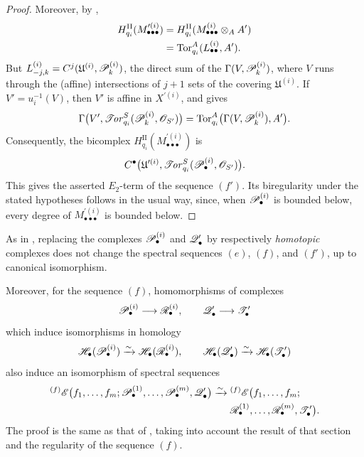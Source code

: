 \begin{proof}
Moreover, by ,
\[
\begin{split}
  H_{q_i}^{\mathrm{II}}
  (M_{\bullet\bullet\bullet}^{\prime(i)})
  &=
  H_{q_i}^{\mathrm{II}}
  (M_{\bullet\bullet\bullet}^{(i)}\otimes_AA')
  \\
  &=
  \operatorname{Tor}_{q_i}^A(L_{\bullet\bullet}^{(i)},A').
\end{split}
\]
But $L_{-j,k}^{(i)}=C^j(\mathfrak U^{(i)},\mathscr{P}_k^{(i)})$, the direct sum of the
$\Gamma(V,\mathscr{P}_k^{(i)})$, where $V$ runs through the (affine)
intersections of $j+1$ sets of the covering $\mathfrak U^{(i)}$.  If
$V'=u_i^{-1}(V)$, then $V'$ is affine in $X^{\prime(i)}$, and
 gives
\[
  \Gamma
  \bigl(
    V',
    \mathscr{T}\!\mathit{or}_{q_i}^S
    (\mathscr{P}_k^{(i)},\mathscr{O}_{S'})
  \bigr)
  =
  \operatorname{Tor}_{q_i}^A
  \bigl(
    \Gamma(V,\mathscr{P}_k^{(i)}),A'
  \bigr).
\]
Consequently, the bicomplex
$H_{q_i}^{\mathrm{II}}
(M_{\bullet\bullet\bullet}^{\prime(i)})$
is
\[
  C^\bullet
  \bigl(
    \mathfrak U^{\prime(i)},
    \mathscr{T}\!\mathit{or}_{q_i}^S
    (\mathscr{P}_\bullet^{(i)},\mathscr{O}_{S'})
  \bigr).
\]
This gives the asserted $E_2$-term of the sequence $(f')$.  Its
biregularity under the stated hypotheses follows in the usual way,
since, when $\mathscr{P}_\bullet^{(i)}$ is bounded below, every degree of
$M_{\bullet\bullet\bullet}^{\prime(i)}$ is bounded below.
\end{proof}

\begin{remark}[6.9.5]
\label{III.6.9.5}
As in , replacing the complexes
$\mathscr{P}_\bullet^{(i)}$ and $\mathscr{Q}_\bullet'$ by respectively
\emph{homotopic} complexes does not change the spectral sequences $(e)$,
$(f)$, and $(f')$, up to canonical isomorphism.

Moreover, for the sequence $(f)$, homomorphisms of complexes
\[
  \mathscr{P}_\bullet^{(i)}\longrightarrow\mathscr{R}_\bullet^{(i)},
  \qquad
  \mathscr{Q}_\bullet'\longrightarrow\mathscr{T}_\bullet'
\]
which induce isomorphisms in homology
\[
  \mathscr{H}_\bullet(\mathscr{P}_\bullet^{(i)})
  \xrightarrow{\sim}
  \mathscr{H}_\bullet(\mathscr{R}_\bullet^{(i)}),
  \qquad
  \mathscr{H}_\bullet(\mathscr{Q}_\bullet')
  \xrightarrow{\sim}
  \mathscr{H}_\bullet(\mathscr{T}_\bullet')
\]
also induce an isomorphism of spectral sequences
\[
\begin{split}
  {}^{(f)}\mathscr{E}
  \bigl(
    f_1,\ldots,f_m;
    \mathscr{P}_\bullet^{(1)},\ldots,\mathscr{P}_\bullet^{(m)},
    \mathscr{Q}_\bullet'
  \bigr)
  \xrightarrow{\sim}\;&
  {}^{(f)}\mathscr{E}
  \bigl(
    f_1,\ldots,f_m;
    \\
    &
    \mathscr{R}_\bullet^{(1)},\ldots,\mathscr{R}_\bullet^{(m)},
    \mathscr{T}_\bullet'
  \bigr).
\end{split}
\]
The proof is the same as that of , taking into
account the result of that section and the regularity of the
sequence $(f)$.
\end{remark}

